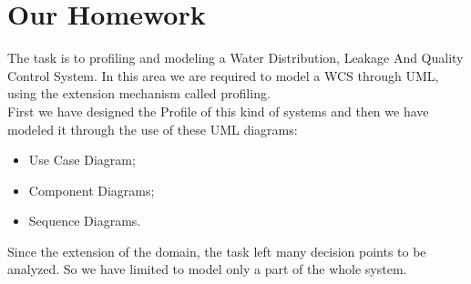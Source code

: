 \chapter{\textbf{Our Homework}}
The task is to profiling and modeling a Water Distribution, Leakage And Quality Control System. In this area we are required to model a WCS through UML, using the extension mechanism called profiling.
\\First we have designed the Profile of this kind of systems and then we have modeled it through the use of these UML diagrams:
\begin{itemize}
	\item Use Case Diagram;
	\item Component Diagrams;
	\item Sequence Diagrams.
\end{itemize}
Since the extension of the domain, the task left many decision points to be analyzed. So we have limited to model only a part of the whole system.
